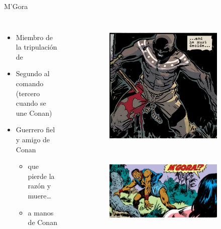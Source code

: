 \begin{frame}{M’Gora}
	\begin{columns}
		\begin{itemize}
			\item Miembro de la tripulación de 
			\item Segundo al comando (tercero cuando se une Conan)
			\item Guerrero fiel y amigo de Conan
			\begin{itemize}
				\item que pierde la razón y muere\ldots
				\item a manos de Conan
			\end{itemize}
		\end{itemize}
		\begin{figure}[htp]
			\centering
			\begin{subfigure}[b]{0.27\textwidth}
				\includegraphics[width=\textwidth]{img/mgora/DH}
			\end{subfigure}
			\\
			\begin{subfigure}[b]{0.6\textwidth}
				\includegraphics[width=\textwidth]{img/mgora/CTB}
			\end{subfigure}
		\end{figure}
	\end{columns}
\end{frame}
